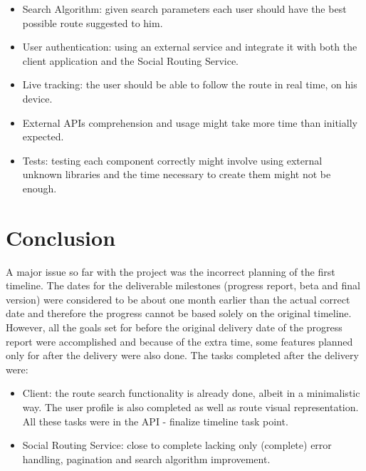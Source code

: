 \documentclass{article}
\begin{document}
        \begin{itemize}
            \item Search Algorithm: given search parameters each user should have the best possible route suggested to him.  
            \item User authentication: using an external service and integrate it with both the client application and the Social Routing Service.
            \item Live tracking: the user should be able to follow the route in real time, on his device.
            \item External APIs comprehension and usage might take more time than initially expected.
            \item Tests: testing each component correctly might involve using external unknown libraries and the time necessary to create them might not be enough. 
        \end{itemize}
    
        \newpage    
    
    \section{Conclusion}    
        A major issue so far with the project was the incorrect planning of the first timeline. The dates for the deliverable milestones (progress report, beta and final version)
        were considered to be about one month earlier than the actual correct date and therefore the progress cannot be based solely on the original timeline. 
        However, all the goals set for before the original delivery date of the progress report were accomplished and because of the extra time, some features planned 
        only for after the delivery were also done. The tasks completed after the delivery were:\par

        \begin{itemize}
            \item Client: the route search functionality is already done, albeit in a minimalistic way. The user profile is also completed as well as route visual representation. All these tasks were in the API - finalize timeline task point.
            \item Social Routing Service: close to complete lacking only (complete) error handling, pagination and search algorithm improvement.
        \end{itemize}
\end{document}
